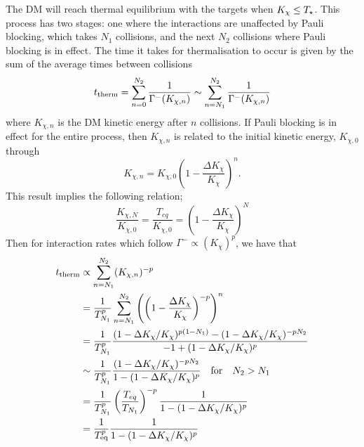 The DM will reach thermal equilibrium with the targets when $K_\chi \leq T_\star$. This process has two stages: one where the interactions are unaffected by Pauli blocking, which takes $N_1$ collisions, and the next $N_2$ collisions where Pauli blocking is in effect. The time it takes for thermalisation to occur is given by the sum of the average times between collisions
\begin{equation}
    t_{\rm therm} = \sum_{n=0}^{N_2} \frac{1}{\Gamma^-(K_{\chi, n})} \sim \sum_{n=N_1}^{N_2} \frac{1}{\Gamma^-(K_{\chi, n})}
\end{equation}
where $K_{\chi, n}$ is the DM kinetic energy after $n$ collisions. If Pauli blocking is in effect for the entire process, then $K_{\chi, n}$ is related to the initial kinetic energy, $K_{\chi, 0}$ through
\begin{equation}
    K_{\chi, n} = K_{\chi, 0}\left( 1 - \frac{\Delta K_\chi}{K_{\chi}}\right)^n.
\end{equation}
This result implies the following relation;
\begin{equation}
    \frac{K_{\chi, N}}{K_{\chi, 0}} = \frac{T_{eq}}{K_{\chi, 0}} = \left( 1 - \frac{\Delta K_\chi}{K_{\chi}}\right)^N
\end{equation}
Then for interaction rates which follow $\Gamma^-\propto (K_\chi)^p$, we have that 
\begin{align}
    t_{\rm therm} & \propto \sum_{n=N_1}^{N_2} (K_{\chi, n})^{-p}\\
    & = \frac{1}{T_{N_1}^{p}}\sum_{n=N_1}^{N_2}\left(\left( 1 - \frac{\Delta K_\chi}{K_{\chi}}\right)^{-p}\right)^n\\
    & = \frac{1}{T_{N_1}^{p}}\frac{(1 - \Delta K_\chi/K_{\chi})^{p(1-N_1)} - (1 -\Delta K_\chi/K_{\chi})^{-p N_2}}{-1 + (1 - \Delta K_\chi/K_{\chi})^p}\\
    & \sim  \frac{1}{T_{N_1}^{p}} \frac{(1 -\Delta K_\chi/K_{\chi})^{-p N_2}}{1 - (1 - \Delta K_\chi/K_{\chi})^p}\quad \text{for}\quad N_2 > N_1\\
    & =  \frac{1}{T_{N_1}^{p}} \left( \frac{T_{eq}}{T_{N_1}}\right)^{-p}\frac{1}{1 - (1 - \Delta K_\chi/K_{\chi})^p}\\
    & = \frac{1}{T_{\rm eq}^p}\frac{1}{1 - (1 - \Delta K_\chi/K_{\chi})^p}
\end{align}






